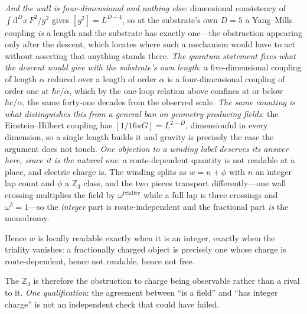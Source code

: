 \documentclass[11pt]{article}
\newcommand{\dd}{\mathrm{d}}
\begin{document}
\emph{And the wall is four-dimensional and nothing else}: dimensional consistency of $\int\dd^{D}x\,F^{2}/g^{2}$ gives $[g^{2}]=L^{D-4}$, so at the substrate's own $D=5$ a Yang--Mills coupling \emph{is} a length and the substrate has exactly one---the obstruction appearing only after the descent, which locates where such a mechanism would have to act without asserting that anything stands there. \emph{The quantum statement fixes what the descent would give with the substrate's own length}: a five-dimensional coupling of length $\alpha$ reduced over a length of order $\alpha$ is a four-dimensional coupling of order one at $\hbar c/\alpha$, which by the one-loop relation above confines at or below $\hbar c/\alpha$, the same forty-one decades from the observed scale. \emph{The same counting is what distinguishes this from a general ban on geometry producing fields}: the Einstein--Hilbert coupling has $[1/16\pi G]=L^{2-D}$, dimensionful in every dimension, so a single length builds it and gravity is precisely the case the argument does not touch. \emph{One objection to a winding label deserves its answer here, since it is the natural one}: a route-dependent quantity is not readable at a place, and electric charge is. The winding splits as $w=n+\phi$ with $n$ an integer lap count and $\phi$ a $\mathbb{Z}_{3}$ class, and the two pieces transport differently---one wall crossing multiplies the field by $\omega^{\text{triality}}$ while a full lap is three crossings and $\omega^{3}=1$---so the \emph{integer} part is route-independent and the fractional part \emph{is} the monodromy. 

Hence $w$ is locally readable exactly when it is an integer, exactly when the triality vanishes: a fractionally charged object is precisely one whose charge is route-dependent, hence not readable, hence not free. 

The $\mathbb{Z}_{3}$ is therefore the obstruction to charge being observable rather than a rival to it. \emph{One qualification}: the agreement between ``is a field'' and ``has integer charge'' is not an independent check that could have failed. 
\end{document}
